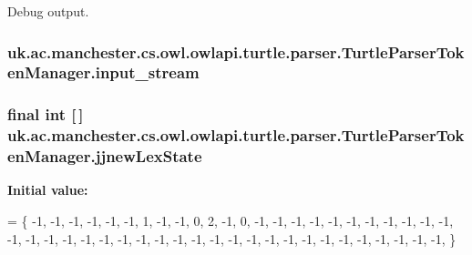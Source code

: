 Debug output. \hypertarget{classuk_1_1ac_1_1manchester_1_1cs_1_1owl_1_1owlapi_1_1turtle_1_1parser_1_1_turtle_parser_token_manager_a13c92357235d06977c5aec69b3d6ed53}{
\subsubsection[{input\-\_\-stream}]{ uk.\-ac.\-manchester.\-cs.\-owl.\-owlapi.\-turtle.\-parser.\-Turtle\-Parser\-Token\-Manager.\-input\-\_\-stream\hspace{0.3cm}{\ttfamily [protected]}}}\label{classuk_1_1ac_1_1manchester_1_1cs_1_1owl_1_1owlapi_1_1turtle_1_1parser_1_1_turtle_parser_token_manager_a13c92357235d06977c5aec69b3d6ed53}
\hypertarget{classuk_1_1ac_1_1manchester_1_1cs_1_1owl_1_1owlapi_1_1turtle_1_1parser_1_1_turtle_parser_token_manager_ae394328808376d08400e4c93d38edde4}{
\subsubsection[{jjnew\-Lex\-State}]{\setlength{\rightskip}{0pt plus 5cm}final int \mbox{[}$\,$\mbox{]} uk.\-ac.\-manchester.\-cs.\-owl.\-owlapi.\-turtle.\-parser.\-Turtle\-Parser\-Token\-Manager.\-jjnew\-Lex\-State\hspace{0.3cm}{\ttfamily [static]}}}\label{classuk_1_1ac_1_1manchester_1_1cs_1_1owl_1_1owlapi_1_1turtle_1_1parser_1_1_turtle_parser_token_manager_ae394328808376d08400e4c93d38edde4}
{\bfseries Initial value\-:}
\begin{DoxyCode}
= \{
   -1, -1, -1, -1, -1, -1, 1, -1, -1, 0, 2, -1, 0, -1, -1, -1, -1, -1, -1, -1, -1, -1, -1, -1, -1, 
   -1, -1, -1, -1, -1, -1, -1, -1, -1, -1, -1, -1, -1, -1, -1, -1, -1, -1, -1, -1, -1, -1, -1, 
\}
\end{DoxyCode}

